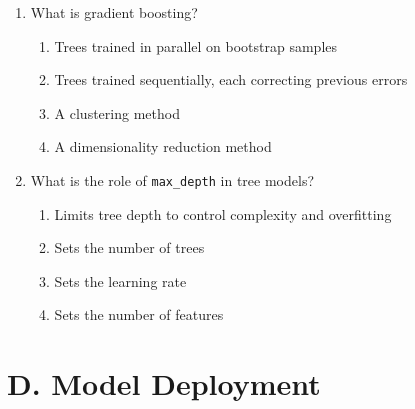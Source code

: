 \documentclass[11pt]{article}
\begin{document}
\begin{enumerate}[leftmargin=*, label=\textbf{Q\arabic*.}, start=58]
		\item What is gradient boosting?
		\begin{enumerate}[label=(\alph*)]
			\item Trees trained in parallel on bootstrap samples
			\item Trees trained sequentially, each correcting previous errors
			\item A clustering method
			\item A dimensionality reduction method
		\end{enumerate}
		
		\item What is the role of \texttt{max\_depth} in tree models?
		\begin{enumerate}[label=(\alph*)]
			\item Limits tree depth to control complexity and overfitting
			\item Sets the number of trees
			\item Sets the learning rate
			\item Sets the number of features
		\end{enumerate}
		
	\end{enumerate}
	
	\newpage
	\section{D. Model Deployment}
	
\end{document}
